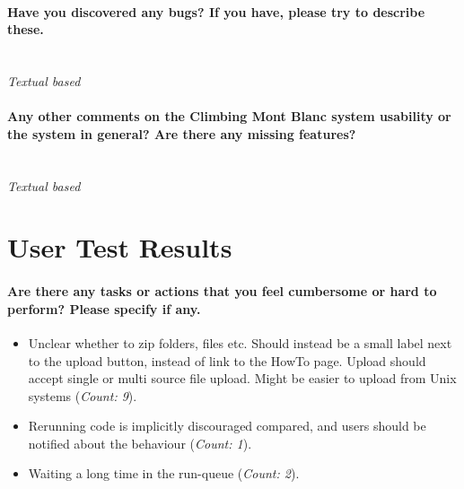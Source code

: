 \paragraph*{Have you discovered any bugs? If you have, please try to describe these.} \hfill \\
\textit{Textual based}

\paragraph*{Any other comments on the Climbing Mont Blanc system usability or the system in general? Are there any missing features?} \hfill \\
\textit{Textual based}


\section{User Test Results}
\paragraph*{Are there any tasks or actions that you feel cumbersome or hard to perform? Please specify if any.} \hfill
\begin{itemize}
  \item Unclear whether to zip folders, files etc. Should instead be a small label next to the upload button, instead of link to the HowTo page. Upload should accept single or multi source file upload. Might be easier to upload from Unix systems (\textit{Count: 9}).
  \item Rerunning code is implicitly discouraged compared, and users should be notified about the behaviour (\textit{Count: 1}).
  \item Waiting a long time in the run-queue (\textit{Count: 2}).
\end{itemize}

